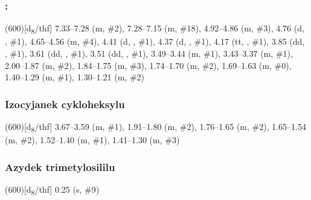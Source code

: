 \pagebreak[1]%
\subsubsection[\refcmpd{glu-tet.cy}]{: }
\marginnote[1em]{}
\begin{experimental}
  \NMR(600)[d\textsubscript{8}\-/\acrshort{thf}] \numrange{7.33}{7.28} (m, \#{2}), \numrange{7.28}{7.15} (m, \#{18}), \numrange{4.92}{4.86} (m, \#{3}), \num{4.76} (d, , \#{1}), \numrange{4.65}{4.56} (m, \#{4}), \num{4.41} (d, , \#{1}), \num{4.37} (d, , \#{1}), \num{4.17} (tt, , \#{1}), \num{3.85} (dd, , \#{1}), \num{3.61} (dd, , \#{1}), \num{3.51} (dd, , \#{1}), \numrange{3.49}{3.44} (m, \#{1}), \numrange{3.43}{3.37} (m, \#{1}), \numrange{2.00}{1.87} (m, \#{2}), \numrange{1.84}{1.75} (m, \#{3}), \numrange{1.74}{1.70} (m, \#{2}), \numrange{1.69}{1.63} (m, \#{0}), \numrange{1.40}{1.29} (m, \#{1}), \numrange{1.30}{1.21} (m, \#{2})
\end{experimental}

\pagebreak[1]%
\subsubsection{Izocyjanek cykloheksylu}
\marginnote{}
\begin{experimental}
  \NMR(600)[d\textsubscript{8}\-/\acrshort{thf}] \numrange{3.67}{3.59} (m, \#{1}), \numrange{1.91}{1.80} (m, \#{2}), \numrange{1.76}{1.65} (m, \#{2}), \numrange{1.65}{1.54} (m, \#{2}), \numrange{1.52}{1.40} (m, \#{1}), \numrange{1.41}{1.30} (m, \#{3})
\end{experimental}

\pagebreak[1]%
\subsubsection{Azydek trimetylosililu}
\marginnote{}
\begin{experimental}
  \NMR(600)[d\textsubscript{8}\-/\acrshort{thf}] \num{0.25} (s, \#{9})
\end{experimental}


